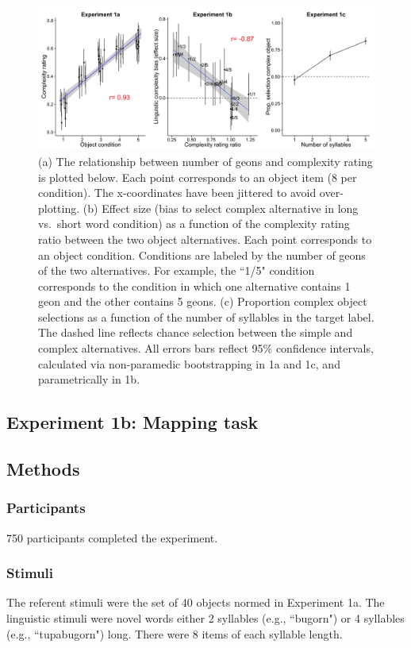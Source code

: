 \documentclass[man]{apa2}
\begin{document}
\begin{figure} 
  \begin{center} 
    \includegraphics[width=6.2in]{figures/study1_plots.png} 
    \caption{\label{fig:study1_plots} (a) The relationship between number of geons and complexity rating is plotted below. Each point corresponds to an object item (8 per condition). The x-coordinates have been jittered to avoid over-plotting. (b) Effect size (bias to select complex alternative in long vs.\ short word condition) as a function of the complexity rating ratio between the two object alternatives. Each point corresponds to an object condition. Conditions are labeled by the number of geons of the two alternatives. For example, the ``1/5" condition corresponds to the condition in which one alternative contains 1 geon and the other contains 5 geons. (c) Proportion complex object selections as a function of the number of syllables in the target label. The dashed line reflects chance selection between the simple and complex alternatives. All errors bars reflect  95\% confidence intervals, calculated via non-paramedic bootstrapping in 1a and 1c, and parametrically in 1b.
 } 
  \end{center} 
\end{figure}	


\subsection{\textbf{Experiment 1b: Mapping task}}


\subsection{Methods}
\subsubsection{Participants} 750 participants completed the experiment.
\subsubsection{Stimuli}
The referent stimuli were the set of 40 objects normed in Experiment 1a. The linguistic stimuli were novel words either 2 syllables (e.g., ``bugorn") or 4 syllables (e.g., ``tupabugorn") long. There were 8 items of each syllable length.
\end{document}
